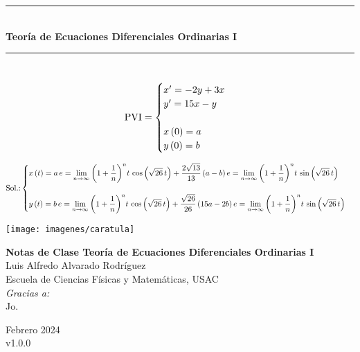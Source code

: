 \begin{titlepage}

\newcommand{\HRule}{\rule{\linewidth}{0.5mm}} 

\center

\HRule \\[0.4cm]

{ \LARGE \bfseries Teoría de Ecuaciones Diferenciales Ordinarias I}\\[0.4cm]

\HRule \\[-0.2cm]

\begin{equation*}
\text{PVI}=\begin{cases}x'=-2y+3x\\y'=15x-y\\\\x\left(0\right)=a\\y\left(0\right)=b \end{cases}
\end{equation*}
 
\begin{equation*}
\text{Sol.:}	\begin{cases}\displaystyle{x\left(t\right)=a\, e=\lim_{n \to \infty^{}}{\left(1+\frac{1}{n}\right)^n}{t}\, \cos{\left(\sqrt{26}\,t\right)}+\frac{2\sqrt{13}}{13}\left(a-b\right)e=\lim_{n \to \infty^{}}{\left(1+\frac{1}{n}\right)^n}{t}\, \sin{\left(\sqrt{26}\,t\right)}}\\\\\displaystyle{y\left(t\right)=b\, e=\lim_{n \to \infty^{}}{\left(1+\frac{1}{n}\right)^n}{t}\, \cos{\left(\sqrt{26}\,t\right)}+\frac{\sqrt{26}}{26}\left(15a-2b\right)e=\lim_{n \to \infty^{}}{\left(1+\frac{1}{n}\right)^n}{t}\, \sin{\left(\sqrt{26}\,t\right)}}\end{cases}
\end{equation*}
 
\begin{center}
\texttt{[image: imagenes/caratula]}
\end{center}

\newpage

\begin{titlepage}
    \centering
    \vspace*{2cm} %
    {\Large\textbf{Notas de Clase Teoría de Ecuaciones Diferenciales Ordinarias I}}\\
    \vspace{1.5cm}
    {\large Luis Alfredo Alvarado Rodríguez}\\
    \vspace{1cm}
    {\large Escuela de Ciencias Físicas y Matemáticas, USAC}\\
    \vspace{3cm}
    {\large\textit{Gracias a:}}\\
    \vspace{1cm}
    Jo.
    
    \vfill
    Febrero 2024\\
    v1.0.0
\end{titlepage}
 
\end{titlepage}